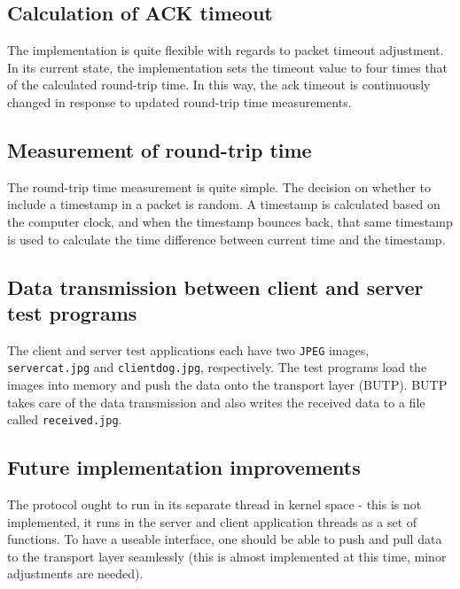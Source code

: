 \documentclass{article}
\begin{document}
\subsection{Calculation of ACK timeout}
The implementation is quite flexible with regards to packet timeout adjustment. In its current state, the implementation sets the timeout value to four times that of the calculated round-trip time. In this way, the ack timeout is continuously changed in response to updated round-trip time measurements.

\subsection{Measurement of round-trip time}
The round-trip time measurement is quite simple. The decision on whether to include a timestamp in a packet is random. A timestamp is calculated based on the computer clock, and when the timestamp bounces back, that same timestamp is used to calculate the time difference between current time and the timestamp.

\subsection{Data transmission between client and server test programs}
The client and server test applications each have two \texttt{JPEG} images, \texttt{servercat.jpg} and \texttt{clientdog.jpg}, respectively. The test programs load the images into memory and push the data onto the transport layer (BUTP). BUTP takes care of the data transmission and also writes the received data to a file called \texttt{received.jpg}.

\subsection{Future implementation improvements}
The protocol ought to run in its separate thread in kernel space - this is not implemented, it runs in the server and client application threads as a set of functions.\newline
To have a useable interface, one should be able to push and pull data to the transport layer seamlessly (this is almost implemented at this time, minor adjustments are needed).
\end{document}
